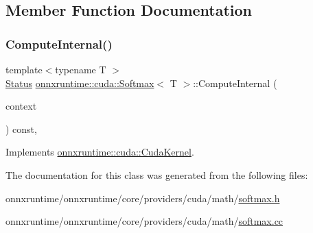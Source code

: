 \subsection{Member Function Documentation}
\mbox{\label{classonnxruntime_1_1cuda_1_1Softmax_a729140e052a2639582dc42fd2ac915b0}} 
\subsubsection{\texorpdfstring{Compute\+Internal()}{ComputeInternal()}}
{\footnotesize\ttfamily template$<$typename T $>$ \\
\mbox{\hyperlink{classonnxruntime_1_1common_1_1Status}{Status}} \mbox{\hyperlink{classonnxruntime_1_1cuda_1_1Softmax}{onnxruntime\+::cuda\+::\+Softmax}}$<$ T $>$\+::Compute\+Internal (\begin{DoxyParamCaption}\item[{\mbox{\hyperlink{classonnxruntime_1_1OpKernelContext}{Op\+Kernel\+Context}} $\ast$}]{context }\end{DoxyParamCaption}) const\hspace{0.3cm}{\ttfamily [override]}, {\ttfamily [virtual]}}



Implements \mbox{\hyperlink{classonnxruntime_1_1cuda_1_1CudaKernel_aca7af04ae448017d6023d30bba231ebb}{onnxruntime\+::cuda\+::\+Cuda\+Kernel}}.



The documentation for this class was generated from the following files\+:\begin{DoxyCompactItemize}
\item 
onnxruntime/onnxruntime/core/providers/cuda/math/\mbox{\hyperlink{cuda_2math_2softmax_8h}{softmax.\+h}}\item 
onnxruntime/onnxruntime/core/providers/cuda/math/\mbox{\hyperlink{cuda_2math_2softmax_8cc}{softmax.\+cc}}\end{DoxyCompactItemize}

